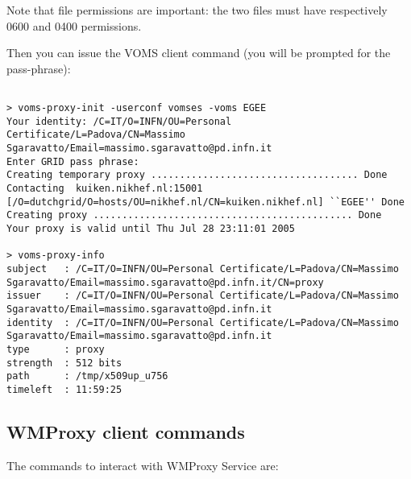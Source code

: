 Note that file permissions are important: the two files must have respectively 
0600 and 0400 permissions.

Then you can issue the VOMS client command (you will be prompted for the pass-phrase):

\smallskip
\begin{scriptsize}
\begin{verbatim}
                                                                                 
> voms-proxy-init -userconf vomses -voms EGEE
Your identity: /C=IT/O=INFN/OU=Personal Certificate/L=Padova/CN=Massimo Sgaravatto/Email=massimo.sgaravatto@pd.infn.it
Enter GRID pass phrase:
Creating temporary proxy .................................... Done
Contacting  kuiken.nikhef.nl:15001 [/O=dutchgrid/O=hosts/OU=nikhef.nl/CN=kuiken.nikhef.nl] ``EGEE'' Done
Creating proxy ............................................. Done
Your proxy is valid until Thu Jul 28 23:11:01 2005
                                                                                 
> voms-proxy-info
subject   : /C=IT/O=INFN/OU=Personal Certificate/L=Padova/CN=Massimo Sgaravatto/Email=massimo.sgaravatto@pd.infn.it/CN=proxy
issuer    : /C=IT/O=INFN/OU=Personal Certificate/L=Padova/CN=Massimo Sgaravatto/Email=massimo.sgaravatto@pd.infn.it
identity  : /C=IT/O=INFN/OU=Personal Certificate/L=Padova/CN=Massimo Sgaravatto/Email=massimo.sgaravatto@pd.infn.it
type      : proxy
strength  : 512 bits
path      : /tmp/x509up_u756
timeleft  : 11:59:25
\end{verbatim}
\end{scriptsize}

\medskip


\subsection{WMProxy client commands}
                                                                                   
The commands to interact with WMProxy Service are:
                                                                                   

